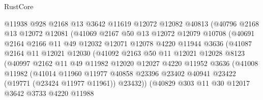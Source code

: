 \begin{lexlean}{RustCore}
\begin{coremodule}
                    @11938
                    @928
                    @2168
                    @13
                    @3642
                    @11619
                    @12072
                    @12082
                    @40813
                    (@40796
                      @2168
                      @13
                      @12072
                      @12081
                      (@41069
                        @2167
                        @50
                        @13
                        @12072
                        @12079
                        @10708
                        (@40691
                          @2164
                          @2166
                          @11
                          @49
                          @12032
                          @12071
                          @12078
                          @4220
                          @11944
                          @3636
                          (@41087
                            @2164
                            @11
                            @12021
                            @12030
                            (@41092
                              @2163
                              @50
                              @11
                              @12021
                              @12028
                              @8123
                              (@40997
                                @2162
                                @11
                                @49
                                @11982
                                @12020
                                @12027
                                @4220
                                @11952
                                @3636
                                (@41008
                                  @11982
                                  (@41014
                                    @11960
                                    @11977
                                    @40858
                                    @23396
                                    @23402
                                    @40941
                                    @23422
                                    (@19771 (@23424 @11977 @11961))
                                    @23432))
                                (@40829
                                  @303
                                  @11
                                  @30
                                  @12017
                                  @3642
                                  @3733
                                  @4220
                                  @11988

\end{coremodule}
\end{lexlean}
